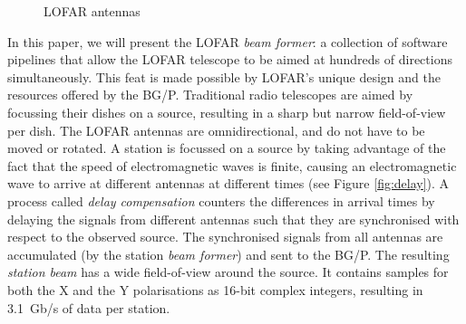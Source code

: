 \documentclass{llncs}
\begin{document}
\begin{figure}[ht]
\hfill
{}
\hfill
{}
\caption{LOFAR antennas}
\end{figure}

In this paper, we will present the LOFAR \emph{beam former}: a collection of software pipelines that allow the LOFAR telescope to be aimed at hundreds of directions simultaneously. This feat is made possible by LOFAR's unique design and the resources offered by the BG/P. Traditional radio telescopes are aimed by focussing their dishes on a source, resulting in a sharp but narrow field-of-view per dish. The LOFAR antennas are omnidirectional, and do not have to be moved or rotated. A station is focussed on a source by taking advantage of the fact that the speed of electromagnetic waves is finite, causing an electromagnetic wave to arrive at different antennas at different times (see Figure \ref{fig:delay}). A process called \emph{delay compensation} counters the differences in arrival times by delaying the signals from different antennas such that they are synchronised with respect to the observed source. The synchronised signals from all antennas are accumulated (by the station \emph{beam former}) and sent to the BG/P. The resulting \emph{station beam} has a wide field-of-view around the source. It contains samples for both the X and the Y polarisations as 16-bit complex integers, resulting in 3.1~Gb/s of data per station.
\end{document}
